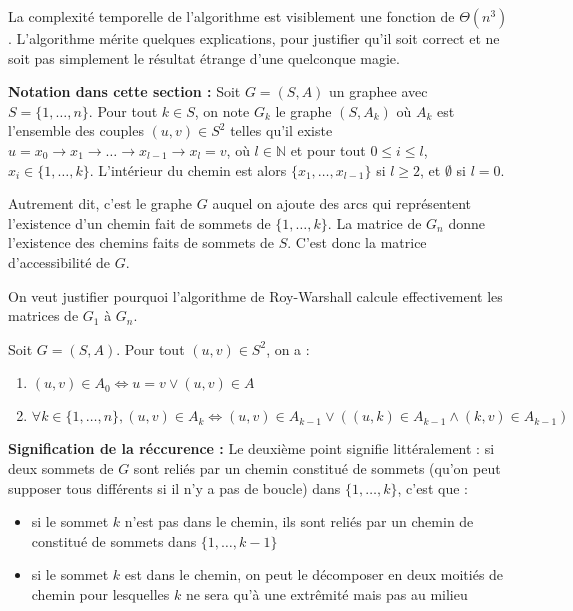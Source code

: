 \documentclass[../../../main.tex]{subfiles}
\begin{document}
La complexité temporelle de l'algorithme est visiblement une fonction de $\Theta(n^3)$. \newline
L'algorithme mérite quelques explications, pour justifier qu'il soit correct et ne soit pas simplement le résultat étrange d'une quelconque magie.

\textbf{Notation dans cette section :} Soit $G = (S, A)$ un graphee avec $S = \{1, \dots, n\}$. Pour tout $k\in S$, on note $G_k$ le graphe $(S, A_k)$ où $A_k$ est l'ensemble des couples $(u, v)\in S^2$ telles qu'il existe $u = x_0\rightarrow x_1 \rightarrow \dots \rightarrow x_{l-1} \rightarrow x_l = v$, où $l\in\mathbb{N}$ et pour tout $0\leq i\leq l$, $x_i\in\{1, \dots, k\}$. L'intérieur du chemin est alors $\{x_1, \dots, x_{l-1}\}$ si $l\geq 2$, et $\emptyset$ si $l = 0$.

Autrement dit, c'est le graphe $G$ auquel on ajoute des arcs qui représentent l'existence d'un chemin fait de sommets de $\{1, \dots, k\}$. La matrice de $G_n$ donne l'existence des chemins faits de sommets de $S$. C'est donc la matrice d'accessibilité de $G$.

On veut justifier pourquoi l'algorithme de Roy-Warshall calcule effectivement les matrices de $G_1$ à $G_n$. 

 Soit $G = (S, A)$. Pour tout $(u, v)\in S^2$, on a :
\begin{enumerate}
	\item $(u, v)\in A_0\Leftrightarrow u = v\vee (u, v)\in A$
	\item $\forall k\in\{1, \dots, n\}, (u, v)\in A_k \Leftrightarrow (u, v)\in A_{k-1}\vee ((u, k)\in A_{k-1}\wedge (k, v)\in A_{k-1})$
\end{enumerate}
\textbf{Signification de la réccurence :} Le deuxième point signifie littéralement : si deux sommets de $G$ sont reliés par un chemin constitué de sommets (qu'on peut supposer tous différents si il n'y a pas de boucle) dans $\{1, \dots, k\}$, c'est que :
\begin{itemize}
	\item si le sommet $k$ n'est pas dans le chemin, ils sont reliés par un chemin de constitué de sommets dans $\{1, \dots, k-1\}$
	\item si le sommet $k$ est dans le chemin, on peut le décomposer en deux moitiés de chemin pour lesquelles $k$ ne sera qu'à une extrêmité mais pas au milieu
\end{itemize}
\end{document}
